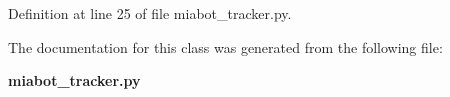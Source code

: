 \subsubsection[{state\-\_\-sub}]{}\label{classmiabot__tracker_1_1miabot__tracker_a92728bf9f5398b74b4644239d3fe6381}


\-Definition at line 25 of file miabot\-\_\-tracker.\-py.



\-The documentation for this class was generated from the following file\-:\begin{DoxyCompactItemize}
\item 
{\bf miabot\-\_\-tracker.\-py}\end{DoxyCompactItemize}
